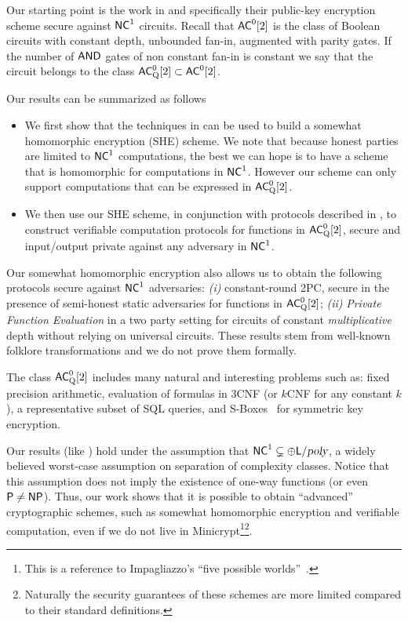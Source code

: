 Our starting point is the work in \cite{fgcrypto} and specifically their public-key encryption scheme secure against ${\mathsf{NC}}^1$ circuits. Recall that ${\mathsf{AC}}^0[2]$ is the class of Boolean circuits with constant depth, unbounded fan-in, 
augmented with parity gates. If the number of $\mathsf{AND}$ gates of non constant fan-in is constant we say that the circuit belongs to the class ${\mathsf{AC}}^0_{\text{Q}}[2] \subset {\ensuremath{\mathsf{AC}}}^0[2]$.

Our results can be summarized as follows
\begin{itemize}
\item We first show that the techniques in \cite{fgcrypto} can be used to build a somewhat homomorphic encryption (SHE) scheme. 
We note that because honest parties are limited to 
${\mathsf{NC}}^1$ computations, the best we can hope is to have a scheme that is homomorphic for computations in ${\mathsf{NC}}^1$. However our scheme can only support computations that can be expressed in 
${\mathsf{AC}}^0_{\text{Q}}[2]$. 

\item We then use our SHE scheme, in conjunction with protocols described in \cite{ggp10,ckv10,aik10}, to construct verifiable 
computation protocols for functions in ${\mathsf{AC}}^0_{\text{Q}}[2]$, secure and input/output private against any adversary in ${\mathsf{NC}}^1$.

\end{itemize}
Our somewhat homomorphic encryption also allows us to obtain the following protocols secure against ${\mathsf{NC}}^1$ adversaries: \textit{(i)} constant-round 2PC, secure in the presence of semi-honest static adversaries for functions in ${\mathsf{AC}}^0_{\text{Q}}[2]$; \textit{(ii)} \textit{Private Function Evaluation} in a two party setting for circuits of constant \textit{multiplicative} depth without relying on universal circuits. These results stem from well-known folklore transformations and we do not prove them formally.

The class ${\mathsf{AC}}^0_{\text{Q}}[2]$ includes many natural and interesting problems such as: fixed precision arithmetic, evaluation of formulas in 3CNF (or $k$CNF for any constant $k$), a representative subset of SQL queries, and S-Boxes~\cite{sboxes} for symmetric key encryption. 

Our results (like \cite{fgcrypto}) hold under the assumption that ${\mathsf{NC}}^1 \subsetneq \oplus {\ensuremath{\mathsf{L}}} / {\textsl{poly}}$, a widely believed worst-case assumption on separation of complexity classes. Notice that this assumption does not imply the existence of one-way functions (or even ${\mathsf{P}} \not = {\mathsf{NP}}$). Thus, our work shows that it is possible to obtain ``advanced'' cryptographic schemes, such as somewhat homomorphic encryption and verifiable computation, even if we do not live in Minicrypt\footnote{This is a reference to Impagliazzo's ``five possible worlds''~\cite{impagliazzo1995personal}.}\footnote{Naturally the security guarantees of these schemes are more limited compared to their standard definitions.}.

